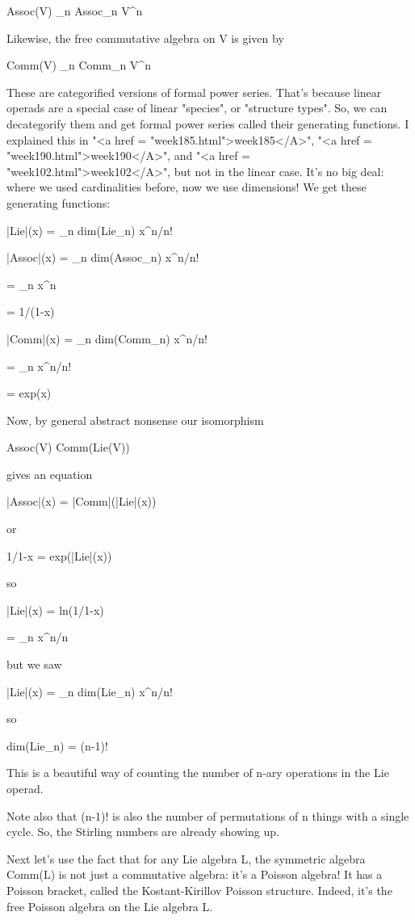 Assoc(V) \cong  \oplus _{n} Assoc_{n} \otimes 
V^{\otimes n}

Likewise, the free commutative algebra on V is given by

Comm(V) \cong  \oplus _{n} Comm_{n} \otimes 
V^{\otimes n}

These are categorified versions of formal power series.  That's
because linear operads are a special case of linear
"species", or "structure types".  So, we can
decategorify them and get formal power series called their generating
functions.  I explained this in "<a href =
"week185.html">week185</A>", "<a href =
"week190.html">week190</A>", and "<a href =
"week102.html">week102</A>", but not in the linear case.  It's no
big deal: where we used cardinalities before, now we use dimensions!
We get these generating functions:

|Lie|(x) = \sum_{n} dim(Lie_{n}) x^{n}/n!
         
|Assoc|(x)  = \sum_{n} dim(Assoc_{n}) x^{n}/n! 
                
         = \sum_{n} x^{n} 
                
         = 1/(1-x)

|Comm|(x)  = \sum_{n} dim(Comm_{n}) x^{n}/n!  
                
         = \sum_{n} x^{n}/n! 
                
         = exp(x)

Now, by general abstract nonsense our isomorphism

Assoc(V) \cong  Comm(Lie(V))

gives an equation

|Assoc|(x) = |Comm|(|Lie|(x))

or 

1/1-x = exp(|Lie|(x))

so

|Lie|(x) = ln(1/1-x) 
           
         = \sum_{n} x^{n}/n

but we saw

|Lie|(x) = \sum_{n} dim(Lie_{n}) x^{n}/n!

so 

dim(Lie_{n}) = (n-1)!

This is a beautiful way of counting the number of n-ary operations in 
the Lie operad.

Note also that (n-1)! is also the number of permutations of n things
with a single cycle.  So, the Stirling numbers are already showing up.

Next let's use the fact that for any Lie algebra L, the symmetric
algebra Comm(L) is not just a commutative algebra: it's a Poisson
algebra!  It has a Poisson bracket, called the Kostant-Kirillov
Poisson structure.  Indeed, it's the free Poisson algebra on the Lie
algebra L.

